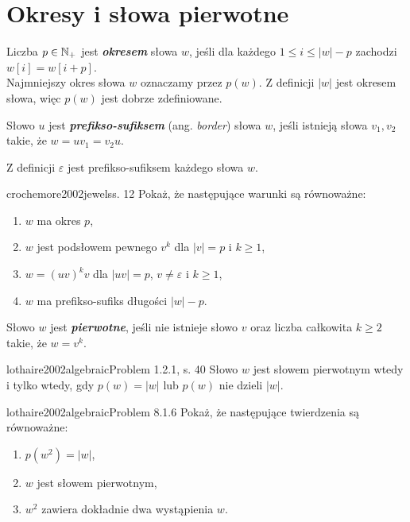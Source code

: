 \section{Okresy i słowa pierwotne}

\begin{definition}{}{}
  Liczba $p \in \mathbb{N}_+$ jest \textbf{\textit{okresem}} słowa $w$, jeśli dla każdego $1 \le i \le |w| - p$ zachodzi $w[i] = w[i + p]$.
  \\
  Najmniejszy okres słowa $w$ oznaczamy przez $p(w)$. Z definicji $|w|$ jest okresem słowa, więc $p(w)$ jest dobrze zdefiniowane.
\end{definition}


\begin{definition}{}{}
  Słowo $u$ jest \textbf{\textit{prefikso-sufiksem}} (ang. \emph{border}) słowa $w$, jeśli istnieją słowa $v_1, v_2$ takie, że $w = u v_1 = v_2 u$.
\end{definition}
Z definicji $\varepsilon$ jest prefikso-sufiksem każdego słowa $w$.

\begin{problem}{crochemore2002jewels}{s. 12}
  Pokaż, że następujące warunki są równoważne:
  \begin{enumerate}[label=(\roman*)]
    \item $w$ ma okres $p$,
    \item $w$ jest podsłowem pewnego $v^k$ dla $|v| = p$ i $k \ge 1$,
    \item $w = (uv)^kv$ dla $|uv| = p$, $v \neq \varepsilon$ i $k \ge 1$,
    \item $w$ ma prefikso-sufiks długości $|w| - p$.
  \end{enumerate} 
\end{problem}

\begin{definition}{}{}
  Słowo $w$ jest \textbf{\textit{pierwotne}}, jeśli nie istnieje słowo $v$ oraz liczba całkowita $k \ge 2$ takie, że $w = v^k$.
\end{definition}

\begin{problem}{lothaire2002algebraic}{Problem 1.2.1, s. 40}
  Słowo $w$ jest słowem pierwotnym wtedy i tylko wtedy, gdy $p(w) = |w|$ lub $p(w)$ nie dzieli $|w|$.
\end{problem}

\begin{problem}{lothaire2002algebraic}{Problem 8.1.6}
  Pokaż, że następujące twierdzenia są równoważne:
  \begin{enumerate}[label=(\roman*)]
    \item $p(w^2) = |w|$,
    \item $w$ jest słowem pierwotnym,
    \item $w^2$ zawiera dokładnie dwa wystąpienia $w$.
  \end{enumerate} 
\end{problem}

